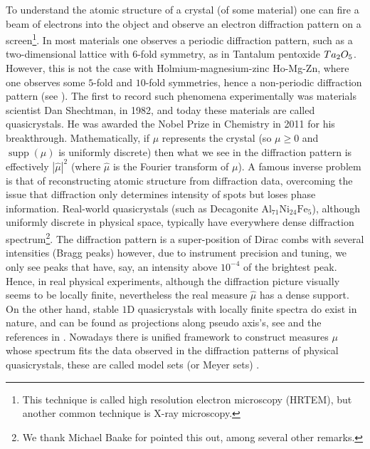 \documentclass[a4paper,reqno,12pt]{amsart}
\DeclareMathOperator{\supp}{\mathrm{supp}}
\newcommand{\ft}{\widehat}
\newcommand{\1}{{\bf 1}}
\renewcommand{\1}{{\bo 1}}
\begin{document}
To understand the atomic structure of a crystal (of some material) one can fire a beam of electrons into the object and observe an electron diffraction pattern on a screen\footnote{This technique is called high resolution electron microscopy (HRTEM), but another common technique is X-ray microscopy.}. In most materials one observes a periodic diffraction pattern, such as a  two-dimensional lattice with $6$-fold symmetry, as in Tantalum pentoxide ${\rm Ta}_2{\rm O}_5$. However, this is not the case with Holmium-magnesium-zinc Ho-Mg-Zn, where one observes some $5$-fold and $10$-fold symmetries, hence a non-periodic diffraction pattern (see \cite[Figures 1 and 2]{dan}). 
The first to record such phenomena experimentally was materials scientist Dan Shechtman, in 1982, and today these materials are called quasicrystals. He was awarded the Nobel Prize in Chemistry in 2011 for his breakthrough. Mathematically, if $\mu$ represents the crystal (so $\mu\geq 0$ and $\supp(\mu)$ is uniformly discrete) then what we see in the diffraction pattern is effectively $|\ft \mu|^2$ (where $\ft \mu$ is the Fourier transform of $\mu$). A famous inverse problem is that of reconstructing atomic structure from diffraction data, overcoming the issue that diffraction only determines intensity of spots but loses phase information. Real-world quasicrystals (such as Decagonite $\text{Al}_{71}\text{Ni}_{24}\text{Fe}_5$), although uniformly discrete in physical space, typically have everywhere dense diffraction spectrum\footnote{We thank Michael Baake for pointed this out, among several other remarks.}.  The diffraction pattern is a super-position
of Dirac combs with several
intensities (Bragg peaks) however, due to instrument precision and tuning, we only see peaks that have, say, an intensity above $10^{-4}$ of the brightest peak. Hence, in real physical experiments, although the diffraction picture visually seems to be locally finite, nevertheless the real measure $\ft \mu$  has a dense support. On the other hand, stable $1$D quasicrystals with locally finite spectra do exist in nature, and can be found as projections along pseudo axis's, see \cite[Figure 1]{QS1D} and the references in \cite[Ch. 7]{DW}. Nowadays there is unified framework to construct measures $\mu$ whose spectrum fits the data observed in the diffraction patterns of physical quasicrystals, these are called model sets (or Meyer sets) \cite{BG2,DW,La,Me95,Me16,Mo}.

\end{document}
